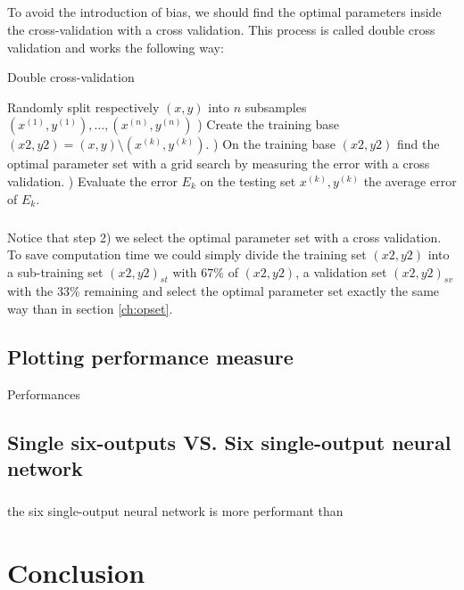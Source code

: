 \documentclass[a4paper,12pt,oneside,final]{report}
\begin{document}
\paragraph{}
To avoid the introduction of bias, we should find the optimal parameters inside the cross-validation with a cross validation. This process is called double cross validation and works the following way:
\begin{algorithm}[H]
\caption{Double cross-validation}
\label{al:dcv}
\begin{algorithmic}[1]
\STATE Randomly split respectively $(x, y)$ into $n$ subsamples $(x^{(1)}, y^{(1)}),\hdots,(x^{(n)}, y^{(n)})$
    ) Create the training base $(x2,y2)=(x, y)\setminus(x^{(k)}, y^{(k)})$.
    ) On the training base $(x2,y2)$ find the optimal parameter set with a grid search by measuring the error with a cross validation.
    ) Evaluate the error $E_k$ on the testing set $x^{(k)}, y^{(k)}$
\ENDFOR
{} the average error of $E_k$.
\end{algorithmic}
\end{algorithm}
\paragraph{}
Notice that step 2) we select the optimal parameter set with a cross validation. To save computation time we could simply divide the training set $(x2,y2)$ into a sub-training set $(x2,y2)_{st}$ with $67\%$ of $(x2,y2)$, a validation set $(x2,y2)_{sv}$ with the $33\%$ remaining and select the optimal parameter set exactly the same way than in section \ref{ch:opset}.

\section{Plotting performance measure}
{\color{red} Performances}

\section{Single six-outputs VS. Six single-output neural network}
\paragraph{}
the six single-output neural network is more performant than

\chapter{Conclusion}
\end{document}
